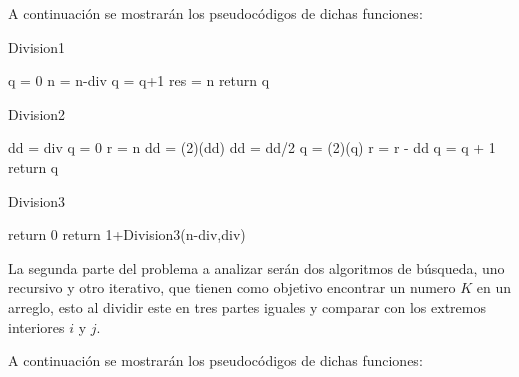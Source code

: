 \documentclass[12pt,twoside]{article}
\begin{document}
    A continuación se mostrarán los pseudocódigos de dichas funciones:
    
    \begin{algorithm}[H]
        \caption{Division1}
        \begin{algorithmic}[1]
        \State q = 0
            \State n = n-div
            \State q = q+1
        \EndWhile
        \State res = n
        \State return q
        \end{algorithmic}
    \end{algorithm}
    \begin{algorithm}[H]
        \caption{Division2}
        \begin{algorithmic}[1]
        \State dd = div
        \State q = 0
        \State r = n
            \State dd = (2)(dd)
        \EndWhile
            \State dd = dd/2
            \State q = (2)(q)
                \State r = r - dd
                \State q = q + 1
            \EndIf
        \EndWhile
        \State return q
        \end{algorithmic}
    \end{algorithm}
    \begin{algorithm}[H]
        \caption{Division3}
        \begin{algorithmic}[1]
            \State return 0
        \Else
            \State return 1+Division3(n-div,div)
        \EndIf
        \end{algorithmic}
    \end{algorithm}
    
    La segunda parte del problema a analizar serán dos algoritmos de búsqueda, uno recursivo y otro iterativo, que tienen como objetivo encontrar un numero $K$ en un arreglo, esto al dividir este en tres partes iguales y comparar con los extremos interiores $i$ y $j$. 
    
    A continuación se mostrarán los pseudocódigos de dichas funciones:
    
\end{document}
